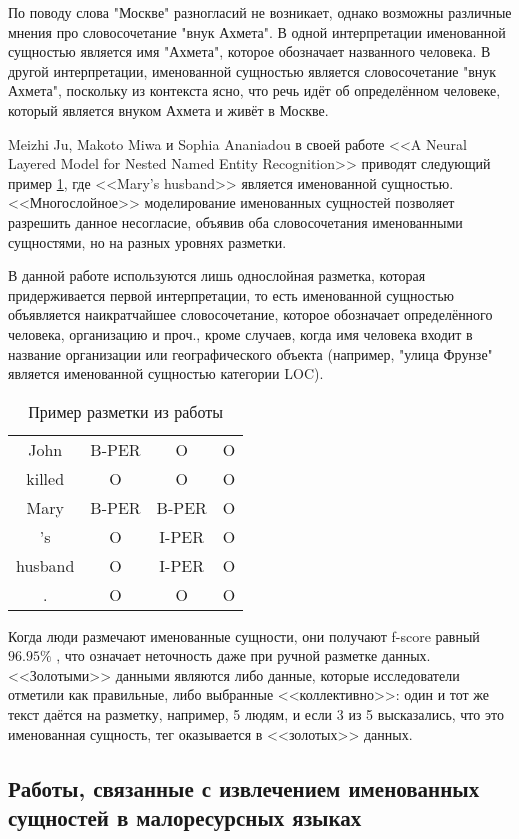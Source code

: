 По поводу слова "Москве" разногласий не возникает, однако возможны различные мнения про словосочетание "внук Ахмета". В одной интерпретации именованной сущностью является имя "Ахмета", которое обозначает названного человека. В другой интерпретации, именованной сущностью является словосочетание "внук Ахмета", поскольку из контекста ясно, что речь идёт об определённом человеке, который является внуком Ахмета и живёт в Москве.

Meizhi Ju, Makoto Miwa и Sophia Ananiadou в своей работе <<A Neural Layered Model for Nested Named Entity Recognition>> \cite{ju-etal-2018-neural} приводят следующий пример \ref{table:example_nested}, где <<Mary's husband>> является именованной сущностью. <<Многослойное>> моделирование именованных сущностей позволяет разрешить данное несогласие, объявив оба словосочетания именованными сущностями, но на разных уровнях разметки.

В данной работе используются лишь однослойная разметка, которая придерживается первой интерпретации, то есть именованной сущностью объявляется наикратчайшее словосочетание, которое обозначает определённого человека, организацию и проч., кроме случаев, когда имя человека входит в название организации или географического объекта (например, "улица Фрунзе" является именованной сущностью категории LOC).

\begin{table}[h]
\begin{tabular}[h]{cccc}
John  &  B-PER  & O  & O \\
killed & O  & O  & O \\ 
Mary  &  B-PER &  B-PER &  O \\
's  & O &  I-PER &  O \\
husband & O &  I-PER &  O \\
.  & O &  O &  O 
\end{tabular}
\caption{Пример разметки из работы \cite{ju-etal-2018-neural} }
\label{table:example_nested}
\end{table}

Когда люди размечают именованные сущности, они получают f-score равный $96.95\%$ \cite{marsh-perzanowski-1998-muc}, что означает неточность даже при ручной разметке данных. <<Золотыми>> данными являются либо данные, которые исследователи отметили как правильные, либо выбранные <<коллективно>>: один и тот же текст даётся на разметку, например, 5 людям, и если 3 из 5 высказались, что это именованная сущность, тег оказывается в <<золотых>> данных.


\subsection{Работы, связанные с извлечением именованных сущностей в малоресурсных языках}

